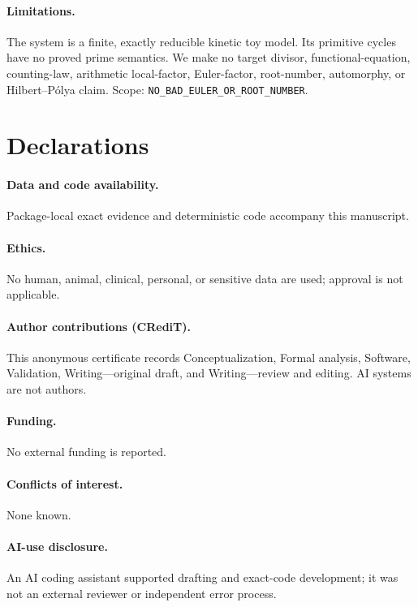\documentclass[10pt]{article}
\begin{document}
\paragraph{Limitations.}
The system is a finite, exactly reducible kinetic toy model.  Its primitive
cycles have no proved prime semantics.  We make no target divisor,
functional-equation, counting-law, arithmetic local-factor, Euler-factor,
root-number, automorphy, or Hilbert--P\'olya claim.  Scope:
\texttt{NO\_BAD\_EULER\_OR\_ROOT\_NUMBER}.

\section*{Declarations}
\paragraph{Data and code availability.} Package-local exact evidence and
deterministic code accompany this manuscript.
\paragraph{Ethics.} No human, animal, clinical, personal, or sensitive data
are used; approval is not applicable.
\paragraph{Author contributions (CRediT).} This anonymous certificate records
Conceptualization, Formal analysis, Software, Validation, Writing---original
draft, and Writing---review and editing.  AI systems are not authors.
\paragraph{Funding.} No external funding is reported.
\paragraph{Conflicts of interest.} None known.
\paragraph{AI-use disclosure.} An AI coding assistant supported drafting and
exact-code development; it was not an external reviewer or independent error
process.
\end{document}
